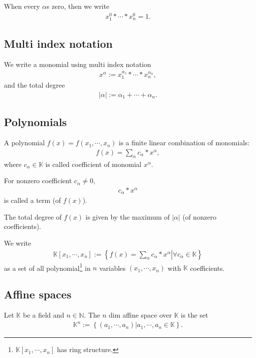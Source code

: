 \documentclass[11pt]{book}
\begin{document}
When every $\alpha$s zero, then we write
\begin{eqnarray}
x_1^{0} * \cdots * x_n^{0} = 1.
\end{eqnarray}

\subsection{Multi index notation}
We write a monomial using multi index notation
\begin{eqnarray}
x^\alpha := x_1^{\alpha_1} * \cdots * x_n^{\alpha_n},
\end{eqnarray}
and the total degree
\begin{eqnarray}
|\alpha| := \alpha_1+ \cdots + \alpha_n.
\end{eqnarray}

\subsection{Polynomials}
A polynomial $f(x) = f(x_1, \cdots, x_n)$ is a finite linear combination of monomials:
\begin{eqnarray}
f(x) = \sum_\alpha c_\alpha * x^\alpha,
\end{eqnarray}
where $c_\alpha \in \mathbb{K}$ is called coefficient of monomial $x^\alpha$.

For nonzero coefficient $c_\alpha \neq 0$,
\begin{eqnarray}
c_\alpha * x^\alpha
\end{eqnarray}
is called a term (of $f(x)$).

The total degree of $f(x)$ is given by the maximum of $|\alpha|$ (of nonzero coefficients).

We write
\begin{eqnarray}
\label{polynomialRing}
\mathbb{K}[x_1,\cdots,x_n] := \left\{\left. f(x) = \sum_\alpha c_\alpha * x^\alpha \right| \forall c_\alpha \in \mathbb{K} \right\}
\end{eqnarray}
as a set of all polynomial\footnote{$\mathbb{K}[x_1,\cdots,x_n]$ has ring structure.} in $n$ variables $(x_1, \cdots, x_n)$ with $\mathbb{K}$ coefficients.

\subsection{Affine spaces}
Let $\mathbb{K}$ be a field and $n \in \mathbb{N}$.
The $n$ dim affine space over $\mathbb{K}$ is the set
\begin{eqnarray}
\mathbb{K}^n := \left\{ \left. (a_1, \cdots, a_n) \right| a_1, \cdots, a_n \in \mathbb{K} \right\}.
\end{eqnarray}
\end{document}

